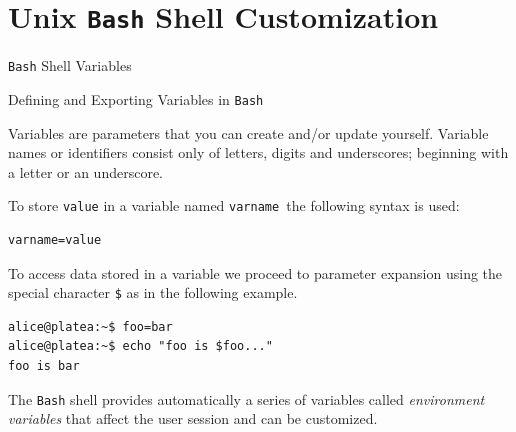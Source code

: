 \section{Unix \texttt{Bash} Shell Customization}
\begin{frame}[t,fragile]{\texttt{Bash} Shell Variables}
  \begin{block}{Defining and Exporting Variables in \texttt{Bash}}
    {\footnotesize 
Variables are
parameters that you can create and/or update yourself. Variable names or identifiers consist only of letters, digits and underscores; beginning with a letter or an underscore.

To store \texttt{value} in a variable named \texttt{varname }the following syntax is used:

        \begin{lstlisting}
varname=value
        \end{lstlisting}

To access data stored in a variable we proceed to
  parameter expansion using the special character \alert{\texttt{\$}} as
  in the following example.


        \begin{lstlisting}
alice@platea:~$ foo=bar
alice@platea:~$ echo "foo is $foo..."
foo is bar
\end{lstlisting}

The \texttt{Bash} shell provides automatically a series
of variables called \alert{\emph{environment variables}} that affect the user session and
can be customized.}      
  \end{block}
  
\end{frame}
